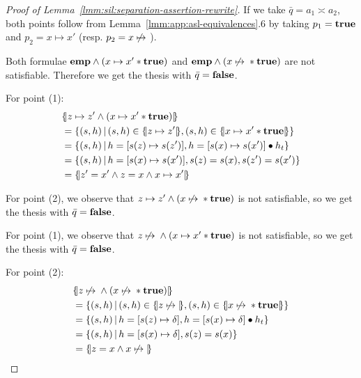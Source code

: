 \begin{proof}[Proof of Lemma~\ref{lmm:sil:separation-assertion-rewrite}]
	If we take $\bar{q} = a_1 \asymp a_2$, both points follow from Lemma~\ref{lmm:app:asl-equivalences}.6 by taking $p_1 = \textbf{true}$ and $p_2 = x \mapsto x'$ (resp. $p_2 = x \not\mapsto{}$).

	Both formulae $\textbf{emp} \land (x \mapsto x' * \textbf{true})$ and $\textbf{emp} \land (x \not\mapsto{} * \textbf{true})$ are not satisfiable. Therefore we get the thesis with $\bar{q} = \textbf{false}$.

	For point (1):
	\begin{align*}
		 & \{\hspace{-2pt}|z \mapsto z' \land (x \mapsto x' * \textbf{true})|\hspace{-2pt}\}                                                \\
		 & =\{ (s, h) \,\vert\, (s, h) \in \{\hspace{-2pt}|z \mapsto z'|\hspace{-2pt}\}, (s, h) \in \{\hspace{-2pt}|x \mapsto x' * \textbf{true}|\hspace{-2pt}\} \} \\
		 & =\{ (s, h) \,\vert\, h = [s(z) \mapsto s(z')], h = [s(x) \mapsto s(x')] \bullet h_t \}                       \\
		 & =\{ (s, h) \,\vert\, h = [s(x) \mapsto s(x')], s(z) = s(x), s(z') = s(x') \}                                 \\
		 & =\{\hspace{-2pt}|z' = x' \land z = x \land x \mapsto x'|\hspace{-2pt}\}
	\end{align*}

	For point (2), we observe that $z \mapsto z' \land (x \not\mapsto{} * \textbf{true})$ is not satisfiable, so we get the thesis with $\bar{q} = \textbf{false}$.

	For point (1), we observe that $z \not\mapsto{}{} \land (x \mapsto x' * \textbf{true})$ is not satisfiable, so we get the thesis with $\bar{q} = \textbf{false}$.

	For point (2):
	\begin{align*}
		 & \{\hspace{-2pt}|z \not\mapsto{} \land (x \not\mapsto{} * \textbf{true})|\hspace{-2pt}\}                                                \\
		 & =\{ (s, h) \,\vert\, (s, h) \in \{\hspace{-2pt}|z \not\mapsto{}|\hspace{-2pt}\}, (s, h) \in \{\hspace{-2pt}|x \not\mapsto{} * \textbf{true}|\hspace{-2pt}\} \} \\
		 & =\{ (s, h) \,\vert\, h = [s(z) \mapsto \delta], h = [s(x) \mapsto \delta] \bullet h_t \}                 \\
		 & =\{ (s, h) \,\vert\, h = [s(x) \mapsto \delta], s(z) = s(x) \}                                           \\
		 & =\{\hspace{-2pt}|z = x \land x \not\mapsto{}|\hspace{-2pt}\}
	\end{align*}


\end{proof}

